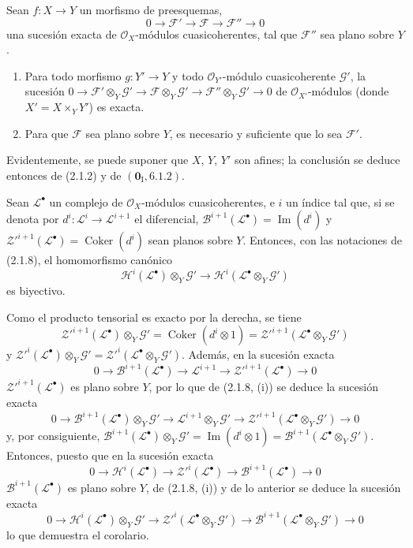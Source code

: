 \begin{proposition}[2.1.8]
\label{IV.2.1.8-fr}
Sean $f:X\to Y$ un morfismo de preesquemas,
\[
0\to\mathscr F'\to\mathscr F\to\mathscr F''\to0
\]
una sucesión exacta de $\mathcal O_X$-módulos cuasicoherentes, tal que
$\mathscr F''$ sea plano sobre $Y$.
\begin{enumerate}
\item[\textup{(i)}] Para todo morfismo $g:Y'\to Y$ y todo $\mathcal O_{Y'}$-módulo
cuasicoherente $\mathscr G'$, la sucesión
$0\to\mathscr F'\otimes_Y\mathscr G'\to
\mathscr F\otimes_Y\mathscr G'\to
\mathscr F''\otimes_Y\mathscr G'\to0$
de $\mathcal O_{X'}$-módulos (donde $X'=X\times_Y Y'$) es exacta.
\item[\textup{(ii)}] Para que $\mathscr F$ sea plano sobre $Y$, es necesario y
suficiente que lo sea $\mathscr F'$.
\end{enumerate}
\end{proposition}

Evidentemente, se puede suponer que $X$, $Y$, $Y'$ son afines; la conclusión se
deduce entonces de (2.1.2) y de $(\mathbf{0}_{\mathrm I},6.1.2)$.

\begin{corollary}[2.1.9]
\label{IV.2.1.9-fr}
Sean $\mathscr L^\bullet$ un complejo de $\mathcal O_X$-módulos
cuasicoherentes, e $i$ un índice tal que, si se denota por
$d^i:\mathscr L^i\to\mathscr L^{i+1}$ el diferencial,
$\mathscr B^{i+1}(\mathscr L^\bullet)=\operatorname{Im}(d^i)$ y
$\mathscr Z'^{i+1}(\mathscr L^\bullet)=\operatorname{Coker}(d^i)$ sean
planos sobre $Y$. Entonces, con las notaciones de \textup{(2.1.8)}, el homomorfismo
canónico
\[
\mathscr H^i(\mathscr L^\bullet)\otimes_Y\mathscr G'
\longrightarrow
\mathscr H^i(\mathscr L^\bullet\otimes_Y\mathscr G')
\]
es biyectivo.
\end{corollary}

Como el producto tensorial es exacto por la derecha, se tiene
\[
\mathscr Z'^{i+1}(\mathscr L^\bullet)\otimes_Y\mathscr G'
=\operatorname{Coker}(d^i\otimes1)
=\mathscr Z'^{i+1}(\mathscr L^\bullet\otimes_Y\mathscr G')
\]
y
$\mathscr Z'^i(\mathscr L^\bullet)\otimes_Y\mathscr G'
=\mathscr Z'^i(\mathscr L^\bullet\otimes_Y\mathscr G')$. Además, en la
sucesión exacta
\[
0\to\mathscr B^{i+1}(\mathscr L^\bullet)\to\mathscr L^{i+1}
\to\mathscr Z'^{i+1}(\mathscr L^\bullet)\to0
\]
$\mathscr Z'^{i+1}(\mathscr L^\bullet)$ es plano sobre $Y$, por lo que de
(2.1.8, (i)) se deduce la sucesión exacta
\[
0\to\mathscr B^{i+1}(\mathscr L^\bullet)\otimes_Y\mathscr G'
\to\mathscr L^{i+1}\otimes_Y\mathscr G'
\to\mathscr Z'^{i+1}(\mathscr L^\bullet\otimes_Y\mathscr G')\to0
\]
y, por consiguiente,
$\mathscr B^{i+1}(\mathscr L^\bullet)\otimes_Y\mathscr G'
=\operatorname{Im}(d^i\otimes1)
=\mathscr B^{i+1}(\mathscr L^\bullet\otimes_Y\mathscr G')$. Entonces, puesto
que en la sucesión exacta
\[
0\to\mathscr H^i(\mathscr L^\bullet)\to\mathscr Z'^i(\mathscr L^\bullet)
\to\mathscr B^{i+1}(\mathscr L^\bullet)\to0
\]
$\mathscr B^{i+1}(\mathscr L^\bullet)$ es plano sobre $Y$, de (2.1.8, (i))
y de lo anterior se deduce la sucesión exacta
\[
0\to\mathscr H^i(\mathscr L^\bullet)\otimes_Y\mathscr G'
\to\mathscr Z'^i(\mathscr L^\bullet\otimes_Y\mathscr G')
\to\mathscr B^{i+1}(\mathscr L^\bullet\otimes_Y\mathscr G')\to0
\]
lo que demuestra el corolario.

